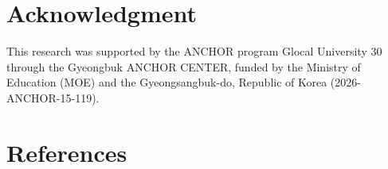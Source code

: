 \documentclass[12pt]{iopart}
\begin{document}
\section*{Acknowledgment}
This research was supported by the ANCHOR program Glocal University 30 through the Gyeongbuk ANCHOR CENTER, funded by the Ministry of Education (MOE) and the Gyeongsangbuk-do, Republic of Korea (2026-ANCHOR-15-119).

\section*{References}


\end{document}

